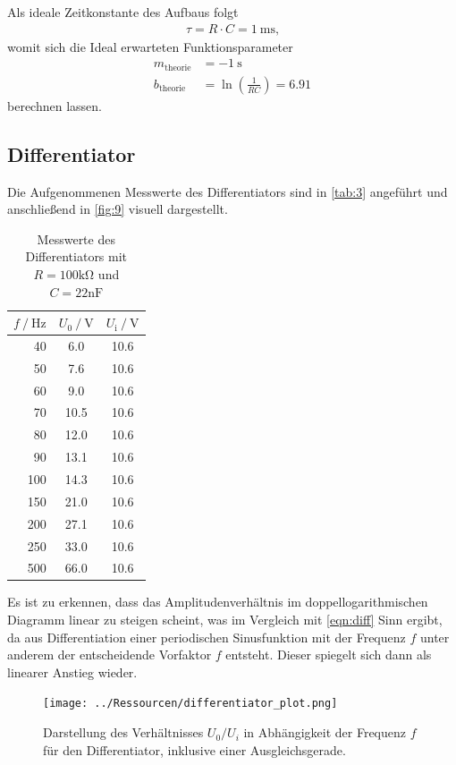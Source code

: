 \documentclass[12pt]{article}
\begin{document}
Als ideale Zeitkonstante des Aufbaus folgt
\begin{align}
  \tau = R\cdot C = \SI{1}{\milli\second}\text{,}
\end{align}
womit sich die Ideal erwarteten Funktionsparameter
\begin{align}
  m_\text{theorie} &= \SI{-1}{\second}\\
  b_\text{theorie} &=\ln\left(\frac{1}{RC}\right) = 6.91
\end{align}
berechnen lassen.
\subsection{Differentiator}
Die Aufgenommenen Messwerte des Differentiators sind in \autoref{tab:3} angeführt und anschließend in \autoref{fig:9} visuell dargestellt.
\begin{table}[H]
  \centering
  \caption{Messwerte des Differentiators mit $R=100\unit{\kilo\ohm}$ und $C=22\unit{\nano\farad}$}
  \begin{tabular}{r | c c}
  \toprule
   $f\mathbin{/}\unit{\hertz}$ &  $U_0\mathbin{/}\unit{\volt}$ &  $U_{\text{i}}\mathbin{/}\unit{\volt}$ \\
  \midrule
  40 & 6.0 & 10.6 \\
  50 & 7.6 & 10.6 \\
  60 & 9.0 & 10.6 \\
  70 & 10.5 & 10.6 \\
  80 & 12.0 & 10.6 \\
  90 & 13.1 & 10.6 \\
  100 & 14.3 & 10.6 \\
  150 & 21.0 & 10.6 \\
  200 & 27.1 & 10.6 \\
  250 & 33.0 & 10.6 \\
  500 & 66.0 & 10.6 \\
  \bottomrule
  \end{tabular}
  \label{tab:3}
\end{table}
Es ist zu erkennen, dass das Amplitudenverhältnis im doppellogarithmischen Diagramm linear zu steigen scheint, was im Vergleich mit \autoref{eqn:diff} Sinn ergibt, da aus Differentiation einer periodischen Sinusfunktion mit der Frequenz $f$ unter anderem der entscheidende Vorfaktor $f$ entsteht.
Dieser spiegelt sich dann als linearer Anstieg wieder.
\begin{figure}[H]
  \centering
  \texttt{[image: ../Ressourcen/differentiator\_plot.png]}
  \caption{Darstellung des Verhältnisses $U_0/U_i$ in Abhängigkeit der Frequenz $f$ für den Differentiator, inklusive einer Ausgleichsgerade.}
  \label{fig:9}
\end{figure}
\end{document}
